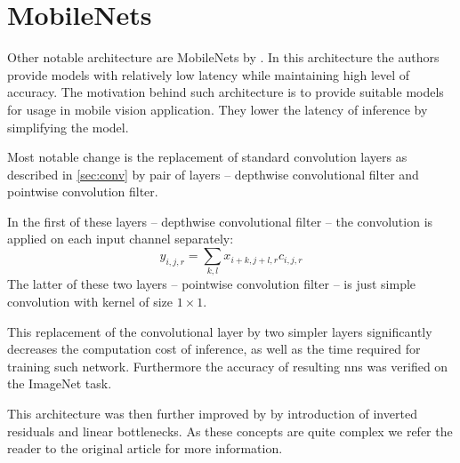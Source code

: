\section{MobileNets}

\label{sec:mobilenet}

Other notable architecture are MobileNets by \cite{mobilenets}. In this
architecture the authors provide models with relatively low latency while
maintaining high level of accuracy. The motivation behind such architecture is
to provide suitable models for usage in mobile vision application. They
lower the latency of inference by simplifying the model.

Most notable change is the replacement of standard convolution layers as
described in \autoref{sec:conv} by pair of layers -- depthwise convolutional
filter and pointwise convolution filter.

In the first of these layers -- depthwise convolutional filter -- the convolution is applied on each input channel
separately:
$$y_{i, j, r} = \sum_{k, l} x_{i+k, j+l, r} c_{i, j, r}$$
The latter of these two layers -- pointwise convolution filter -- is just simple convolution with kernel of size
$1 \times 1$.

This replacement of the convolutional layer by two simpler layers significantly decreases the computation cost of inference, as well
as the time required for training such network. Furthermore the accuracy of
resulting \glspl{nn} was verified on the ImageNet task.

This architecture was then further improved by \cite{mobilenetv2} by
introduction of inverted residuals and linear bottlenecks. As these concepts
are quite complex we refer the reader to the original article for more
information.